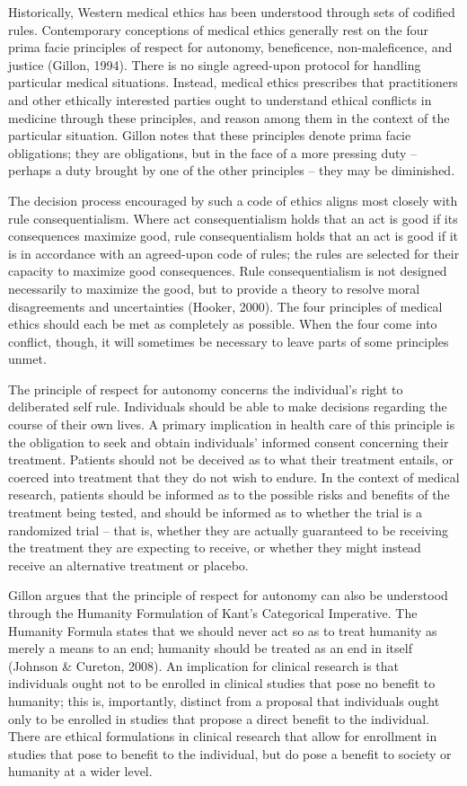 \documentclass[]{spie}  %
\begin{document}
Historically, Western medical ethics has been understood through sets of codified rules. Contemporary conceptions of medical ethics generally rest on the four prima facie principles of respect for autonomy, beneficence, non-maleficence, and justice (Gillon, 1994). There is no single agreed-upon protocol for handling particular medical situations. Instead, medical ethics prescribes that practitioners and other ethically interested parties ought to understand ethical conflicts in medicine through these principles, and reason among them in the context of the particular situation. Gillon notes that these principles denote prima facie obligations; they are obligations, but in the face of a more pressing duty – perhaps a duty brought by one of the other principles – they may be diminished.

The decision process encouraged by such a code of ethics aligns most closely with rule consequentialism. Where act consequentialism holds that an act is good if its consequences maximize good, rule consequentialism holds that an act is good if it is in accordance with an agreed-upon code of rules; the rules are selected for their capacity to maximize good consequences. Rule consequentialism is not designed necessarily to maximize the good, but to provide a theory to resolve moral disagreements and uncertainties (Hooker, 2000). The four principles of medical ethics should each be met as completely as possible. When the four come into conflict, though, it will sometimes be necessary to leave parts of some principles unmet.

The principle of respect for autonomy concerns the individual’s right to deliberated self rule. Individuals should be able to make decisions regarding the course of their own lives. A primary implication in health care of this principle is the obligation to seek and obtain individuals’ informed consent concerning their treatment. Patients should not be deceived as to what their treatment entails, or coerced into treatment that they do not wish to endure. In the context of medical research, patients should be informed as to the possible risks and benefits of the treatment being tested, and should be informed as to whether the trial is a randomized trial – that is, whether they are actually guaranteed to be receiving the treatment they are expecting to receive, or whether they might instead receive an alternative treatment or placebo.

Gillon argues that the principle of respect for autonomy can also be understood through the Humanity Formulation of Kant’s Categorical Imperative. The Humanity Formula states that we should never act so as to treat humanity as merely a means to an end; humanity should be treated as an end in itself (Johnson \& Cureton, 2008). An implication for clinical research is that individuals ought not to be enrolled in clinical studies that pose no benefit to humanity; this is, importantly, distinct from a proposal that individuals ought only to be enrolled in studies that propose a direct benefit to the individual. There are ethical formulations in clinical research that allow for enrollment in studies that pose to benefit to the individual, but do pose a benefit to society or humanity at a wider level.
\end{document}
